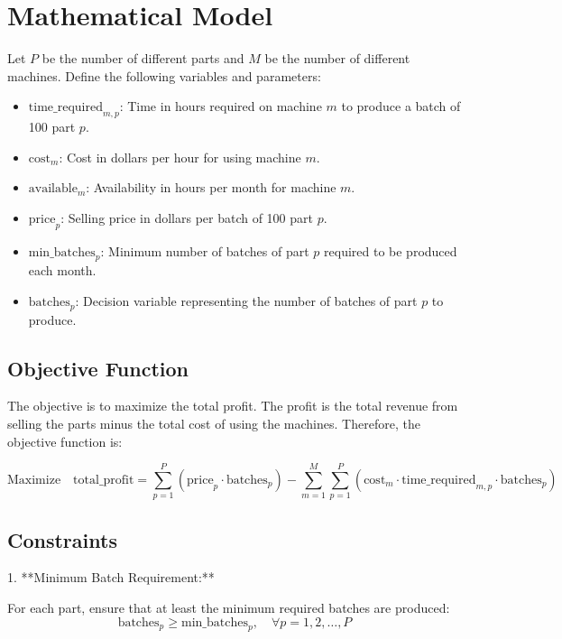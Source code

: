 \documentclass{article}
\begin{document}
\section*{Mathematical Model}

Let \( P \) be the number of different parts and \( M \) be the number of different machines. Define the following variables and parameters:

\begin{itemize}
    \item \( \text{time\_required}_{m,p} \): Time in hours required on machine \( m \) to produce a batch of 100 part \( p \).
    \item \( \text{cost}_{m} \): Cost in dollars per hour for using machine \( m \).
    \item \( \text{available}_{m} \): Availability in hours per month for machine \( m \).
    \item \( \text{price}_{p} \): Selling price in dollars per batch of 100 part \( p \).
    \item \( \text{min\_batches}_{p} \): Minimum number of batches of part \( p \) required to be produced each month.
    \item \( \text{batches}_{p} \): Decision variable representing the number of batches of part \( p \) to produce.
\end{itemize}

\subsection*{Objective Function}

The objective is to maximize the total profit. The profit is the total revenue from selling the parts minus the total cost of using the machines. Therefore, the objective function is:

\[
\text{Maximize} \quad \text{total\_profit} = \sum_{p=1}^{P} (\text{price}_{p} \cdot \text{batches}_{p}) - \sum_{m=1}^{M} \sum_{p=1}^{P} (\text{cost}_{m} \cdot \text{time\_required}_{m,p} \cdot \text{batches}_{p})
\]

\subsection*{Constraints}

1. **Minimum Batch Requirement:**

   For each part, ensure that at least the minimum required batches are produced:
   \[
   \text{batches}_{p} \geq \text{min\_batches}_{p}, \quad \forall p = 1, 2, \ldots, P
   \]
\end{document}
